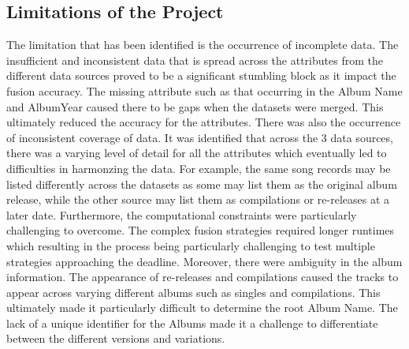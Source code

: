 \documentclass[runningheads]{llncs}
\begin{document}
\subsection{Limitations of the Project}
The limitation that has been identified is the occurrence of incomplete data. The insufficient and inconsistent data that is spread across the attributes from the different data sources proved to be a significant stumbling block as it impact the fusion accuracy. The missing attribute such as that occurring in the Album Name and AlbumYear caused there to be gaps when the datasets were merged. This ultimately reduced the accuracy for the attributes. There was also the occurrence of inconsistent coverage of data. It was identified that across the 3 data sources, there was a varying level of detail for all the attributes which eventually led to difficulties in harmonzing the data. For example, the same song records may be listed differently across the datasets as some may list them as the original album release, while the other source may list them as compilations or re-releases at a later date. Furthermore, the computational constraints were particularly challenging to overcome. The complex fusion strategies required longer runtimes which resulting in the process being particularly challenging to test multiple strategies approaching the deadline. Moreover, there were ambiguity in the album information. The appearance of re-releases and compilations caused the tracks to appear across varying different albums such as singles and compilations. This ultimately made it particularly difficult to determine the root Album Name. The lack of a unique identifier for the Albums made it a challenge to differentiate between the different versions and variations.
\end{document}

